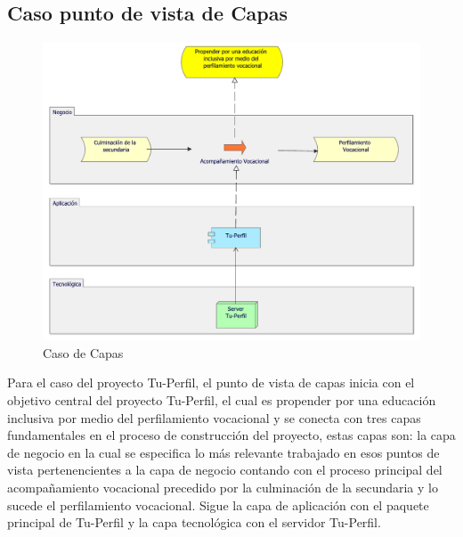 \subsection{Caso punto de vista de Capas}
\begin{figure}[h!]
	\centering
	\includegraphics[width=1\linewidth]{imgs/caso/CapasTuPerfil}
	\caption{Caso de Capas}
\end{figure}

Para el caso del proyecto Tu-Perfil, el punto de vista de capas inicia con el objetivo central del proyecto Tu-Perfil, el cual es propender por una educación inclusiva por medio del perfilamiento vocacional y se conecta con tres capas fundamentales en el proceso de construcción del proyecto, estas capas son: la capa de negocio en la cual se especifica lo más relevante trabajado en esos puntos de vista pertenencientes a la capa de negocio contando con el proceso principal del acompañamiento vocacional precedido por la culminación de la secundaria y lo sucede el perfilamiento vocacional. Sigue la capa de aplicación con el paquete principal de Tu-Perfil y la capa tecnológica con el servidor Tu-Perfil.

\clearpage